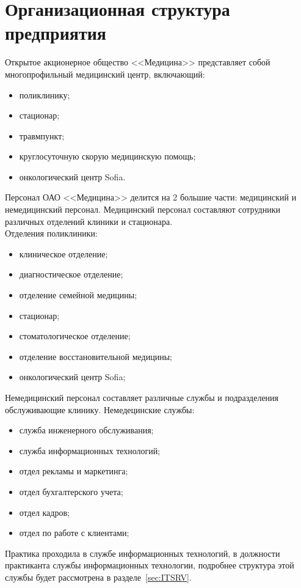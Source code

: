 \section{Организационная структура предприятия}
Открытое акционерное общество <<Медицина>> представляет собой многопрофильный медицинский центр, включающий:
\begin{itemize}
\item поликлинику;
\item стационар;
\item травмпункт;
\item круглосуточную скорую медицинскую помощь;
\item онкологический центр Sofia.
\end{itemize}
Персонал ОАО <<Медицина>> делится на 2 большие части: медицинский и немедицинский персонал.
Медицинский персонал составляют сотрудники различных отделений клиники и стационара.\\
Отделения поликлиники:
\begin{itemize}
\item клиническое отделение;
\item диагностическое отделение;
\item отделение семейной медицины;
\item стационар;
\item стоматологическое отделение;
\item отделение восстановительной медицины;
\item онкологический центр Sofia;
\end{itemize}
Немедицинский персонал составляет различные службы и подразделения обслуживающие клинику.
Немедецинские службы:
\begin{itemize}
\item служба инженерного обслуживания;
\item служба информационных технологий;
\item отдел рекламы и маркетинга;
\item отдел бухгалтерского учета;
\item отдел кадров;
\item отдел по работе с клиентами;
\end{itemize}
Практика проходила в службе информационных технологий, в должности практиканта службы информационных технологии, подробнее структура этой службы будет рассмотрена в разделе~\ref{sec:ITSRV}.
